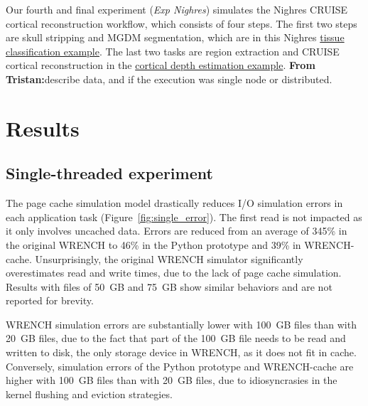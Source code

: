 \documentclass[conference]{IEEEtran}
\newcommand{\tristan}[1]{\color{orange}\textbf{From Tristan:}#1\color{black}}
\newcommand{\wrench}{WRENCH\xspace}
\begin{document}
            Our fourth and final experiment (\textit{Exp Nighres})
            simulates the Nighres CRUISE cortical reconstruction workflow, which consists 
            of four steps. The first two steps are skull stripping and MGDM segmentation, 
            which are in this Nighres \href{{https://nighres.readthedocs.io/en/latest/auto_examples/example_01_tissue_classification.html}}{tissue classification example}. 
            The last two tasks are region extraction and CRUISE cortical reconstruction 
            in the   
            \href{https://nighres.readthedocs.io/en/latest/auto_examples/example_02_cortical_depth_estimation.html}{cortical depth estimation example}.
            \tristan{describe data, and if the execution was single node or
            distributed.}

    \section{Results}
    \label{results}

        \subsection{Single-threaded experiment}

        The page cache simulation model drastically reduces I/O simulation
        errors in each application task (Figure~\ref{fig:single_error}). The first read is not impacted
        as it only involves uncached data. Errors are reduced from an average
        of 345\% in the original \wrench to 46\% in the Python prototype and
        39\% in \wrench-cache. Unsurprisingly, the original \wrench simulator
        significantly overestimates read and write times, due to the lack
        of page cache simulation. Results with files of 50~GB and 75~GB
        show similar behaviors and are not reported for brevity.

        \wrench simulation errors are substantially lower with 100~GB
        files than with 20~GB files, due to the fact that part of the
        100~GB file needs to be read and written to disk, the only storage
        device in \wrench, as it does not fit in cache. Conversely,
        simulation errors of the Python prototype and \wrench-cache are higher with
        100~GB files than with 20~GB files, due to idiosyncrasies in the kernel
        flushing and eviction strategies.
\end{document}
